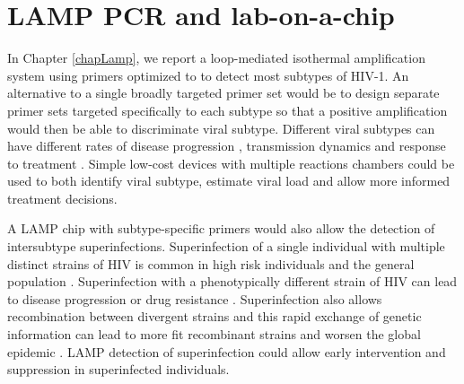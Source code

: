 \documentclass[../sherrill-Mix_thesis.tex]{subfiles}
\begin{document}








\section{LAMP PCR and lab-on-a-chip}
		In Chapter \ref{chapLamp}, we report a loop-mediated isothermal amplification system using primers optimized to to detect most subtypes of HIV-1. An alternative to a single broadly targeted primer set would be to design separate primer sets targeted specifically to each subtype so that a positive amplification would then be able to discriminate viral subtype. Different viral subtypes can have different rates of disease progression \citep{Kanki1999,Kaleebu2002,Baeten2007,Kiwanuka2008}, transmission dynamics \citep{Renjifo2004,John-Stewart2005,Huang2007b} and response to treatment \citep{Snoeck2006,Easterbrook2010,Scherrer2011}. Simple low-cost devices with multiple reactions chambers could be used to both identify viral subtype, estimate viral load \citep{Liu2014a,Mauk2015} and allow more informed treatment decisions.
		
		A LAMP chip with subtype-specific primers would also allow the detection of intersubtype superinfections. Superinfection of a single individual with multiple distinct strains of HIV is common in high risk individuals \citep{Piantadosi2007,Powell2009,Ronen2013,Wagner2013,Redd2014} and the general population \citep{Redd2012a}. Superinfection with a phenotypically different strain of HIV can lead to disease progression \citep{Jost2002,Fang2004,Blick2007,Gottlieb2007,Streeck2008,Clerc2010} or drug resistance \citep{Smith2005}. Superinfection also allows recombination between divergent strains \citep{Fang2004,Pernas2006,Blick2007,Piantadosi2007,Streeck2008} and this rapid exchange of genetic information can lead to more fit recombinant strains and worsen the global epidemic \citep{Robertson1995,Gao1999,Hahn2000,Malim2001,Blick2007}. LAMP detection of superinfection could allow early intervention and suppression in superinfected individuals.
\end{document}
